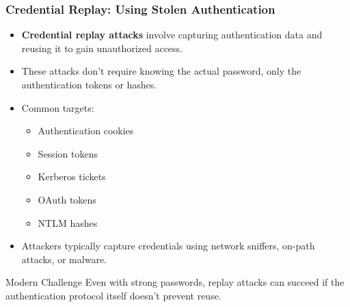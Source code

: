 \documentclass{beamer}
\begin{document}
\begin{frame}
    \frametitle{Credential Replay: Using Stolen Authentication}
    
    \begin{itemize}
        \item \textbf{Credential replay attacks} involve capturing authentication data and reusing it to gain unauthorized access.
        \item These attacks don't require knowing the actual password, only the authentication tokens or hashes.
        \item Common targets:
            \begin{itemize}
                \item Authentication cookies
                \item Session tokens
                \item Kerberos tickets
                \item OAuth tokens
                \item NTLM hashes
            \end{itemize}
        \item Attackers typically capture credentials using network sniffers, on-path attacks, or malware.
    \end{itemize}
    
    \begin{block}{Modern Challenge}
        Even with strong passwords, replay attacks can succeed if the authentication protocol itself doesn't prevent reuse.
    \end{block}
\end{frame}
\end{document}
